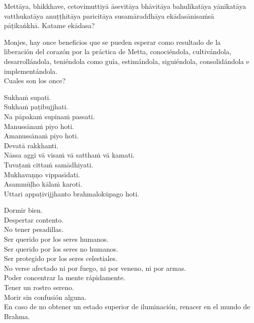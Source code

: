 \begin{leader}
\end{leader}

Mettāya, bhikkhave, cetovimuttiyā āsevitāya bhāvitāya bahulīkatāya yānīkatāya vatthukatāya anuṭṭhitāya paricitāya susamāraddhāya ekādasānisaṁsā pāṭikaṅkhā. Katame ekādasa?

\begin{english}
  Monjes, hay once beneficios que se pueden esperar como resultado de la liberación del corazón por la práctica de Metta, conociéndola, cultivándola, desarrollándola, teniéndola como guía, estimándola, siguiéndola, consolidándola e implementándola.\\
  Cuales son los once?
\end{english}

Sukhaṁ supati.\\
Sukhaṁ paṭibujjhati.\\
Na pāpakaṁ supinaṁ passati.\\
Manussānaṁ piyo hoti.\\
Amanussānaṁ piyo hoti.\\
Devatā rakkhanti.\\
Nāssa aggi vā visaṁ vā satthaṁ vā kamati.\\
Tuvaṭaṁ cittaṁ samādhiyati.\\
Mukhavaṇṇo vippasīdati.\\
Asammūḷho kālaṁ karoti.\\
Uttari appaṭivijjhanto brahmalokūpago hoti.

\clearpage

\begin{english}
  Dormir bien.\\
  Despertar contento.\\
  No tener pesadillas.\\
  Ser querido por los seres humanos.\\
  Ser querido por los seres no humanos.\\
  Ser protegido por los seres celestiales.\\
  No verse afectado ni por fuego, ni por veneno, ni por armas.\\
  Poder concentrar la mente rápidamente.\\
  Tener un rostro sereno.\\
  Morir sin confusión alguna.\\
  En caso de no obtener un estado superior de iluminación, renacer en el mundo de Brahma.
\end{english}

